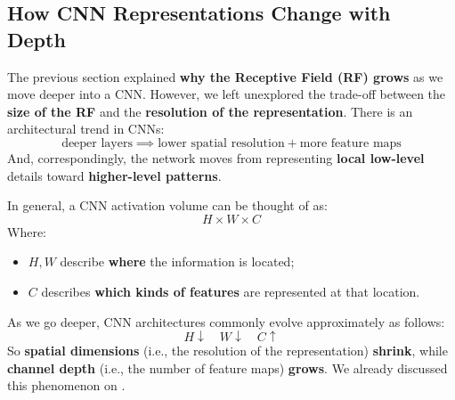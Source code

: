 \subsection{How CNN Representations Change with Depth}\label{sec:how-cnn-representations-change-with-depth}

The previous section explained \textbf{why the Receptive Field (RF) grows} as we move deeper into a CNN. However, we left unexplored the trade-off between the \textbf{size of the RF} and the \textbf{resolution of the representation}. There is an architectural trend in CNNs:
\begin{equation*}
    \text{deeper layers} \implies \text{lower spatial resolution} + \text{more feature maps}
\end{equation*}
And, correspondingly, the network moves from representing \textbf{local low-level} details toward \textbf{higher-level patterns}.

\highspace
In general, a CNN activation volume can be thought of as:
\begin{equation*}
    H \times W \times C
\end{equation*}
Where:
\begin{itemize}
    \item $H,W$ describe \textbf{where} the information is located;
    \item $C$ describes \textbf{which kinds of features} are represented at that location.
\end{itemize}
As we go deeper, CNN architectures commonly evolve approximately as follows:
\begin{equation*}
    H \downarrow \quad W \downarrow \quad C \uparrow
\end{equation*}
So \textbf{spatial dimensions} (i.e., the resolution of the representation) \textbf{shrink}, while \textbf{channel depth} (i.e., the number of feature maps) \textbf{grows}. We already discussed this phenomenon on .

